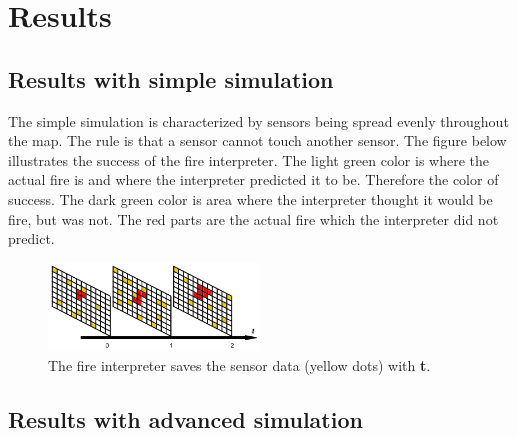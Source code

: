 \section{Results}

\subsection{Results with simple simulation}
The simple simulation is characterized by sensors being spread evenly throughout the map. The rule is that a sensor cannot touch another sensor. The figure below illustrates the success of the fire interpreter. The light green color is where the actual fire is and where the interpreter predicted it to be. Therefore the color of success. The dark green color is area where the interpreter thought it would be fire, but was not. The red parts are the actual fire which the interpreter did not predict.
\begin{figure}[here]
  \centering
      \includegraphics[width=0.5\textwidth]{solution/graphics/timeElapse.png}
  \caption{The fire interpreter saves the sensor data (yellow dots) with \textbf{t}.}
  \label{fig:simple-results}
\end{figure}


\subsection{Results with advanced simulation}